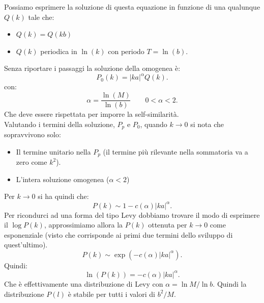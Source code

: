 \noindent
Possiamo esprimere la soluzione di questa equazione in funzione di una qualunque $Q(k)$ tale che:
\begin{itemize}
    \item $Q(k) = Q(kb)$ 
    \item $Q(k)$ periodica in $\ln (k)$ con periodo $T = \ln (b)$.
\end{itemize}
Senza riportare i passaggi la soluzione della omogenea è:
\[
    P_0(k) = \left|ka\right|^{\alpha}Q(k) 
.\] 
con:
\[
    \alpha  = \frac{\ln(M)}{\ln(b)} \qquad 0<\alpha <2
.\] 
Che deve essere rispettata per imporre la self-similarità.\\
Valutando i termini della soluzione, $P_p$ e $P_0$, quando $k\to 0$ si nota che sopravvivono solo:
\begin{itemize}
    \item Il termine unitario nella $P_p$ (il termine più rilevante nella sommatoria va a zero come $k^2$).
    \item L'intera soluzione omogenea ($\alpha < 2$)
\end{itemize}
Per $k\to 0$ si ha quindi che:
\[
    P(k) \sim 1 - c(\alpha) \left|ka\right|^\alpha
.\] 
Per ricondurci ad una forma del tipo Levy dobbiamo trovare il modo di esprimere il $\log P(k) $, approssimiamo allora la $P(k)$ ottenuta per $k\to 0$ come esponenziale (visto che corrisponde ai primi due termini dello sviluppo di quest'ultimo).
\[
    P(k) \sim \exp\left(-c(\alpha) \left|k a\right|^\alpha\right)
.\] 
Quindi:
\[
    \ln (P(k) ) = -c(\alpha) \left|k a\right|^\alpha
.\] 
Che è effettivamente una distribuzione di Levy con $\alpha  = \ln M /\ln b$. Quindi la distribuzione $P(l)$ è stabile per tutti i valori di $b^2 /M$.
\clearpage
